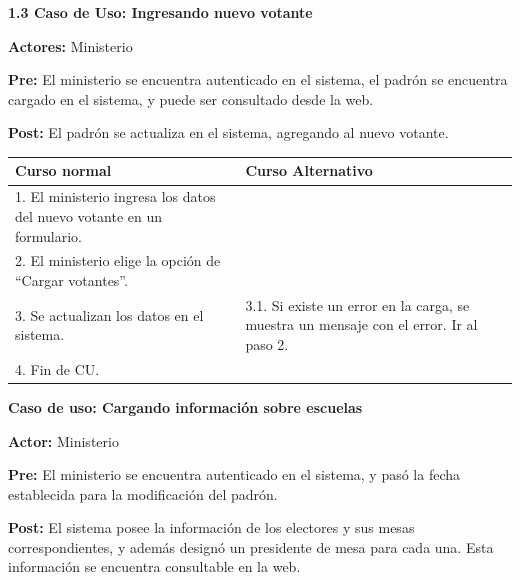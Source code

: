 \textbf{1.3 Caso de Uso: Ingresando nuevo votante}

\textbf{Actores:} Ministerio

\textbf{Pre:} El ministerio se encuentra autenticado en el sistema, el padrón se encuentra cargado en el sistema, y puede ser consultado desde la web.

\textbf{Post:} El padrón se actualiza en el sistema, agregando al nuevo votante.
\begin{table}[h!]
	
 \begin{tabular}{|p{7.5cm} | p{7.5cm}|} 
 \hline
 \textbf{Curso normal} & \textbf{Curso Alternativo} \\
 \hline

1. El ministerio ingresa los datos del nuevo votante en un formulario. & \\
\hline

2. El ministerio elige la opción de “Cargar votantes”. & \\
\hline

3. Se actualizan los datos en el sistema. & 3.1. Si existe un error en la carga, se muestra un mensaje con el error. Ir al paso 2. \\
\hline
4. Fin de CU. & \\
 \hline
 \end{tabular}

\end{table}

\textbf{Caso de uso: Cargando información sobre escuelas}

\textbf{Actor:} Ministerio

\textbf{Pre:} El ministerio se encuentra autenticado en el sistema, y pasó la fecha establecida para la modificación del padrón.

\textbf{Post:} El sistema posee la información de los electores y sus mesas correspondientes, y además designó un presidente de mesa para cada una. Esta información se encuentra consultable en la web.


